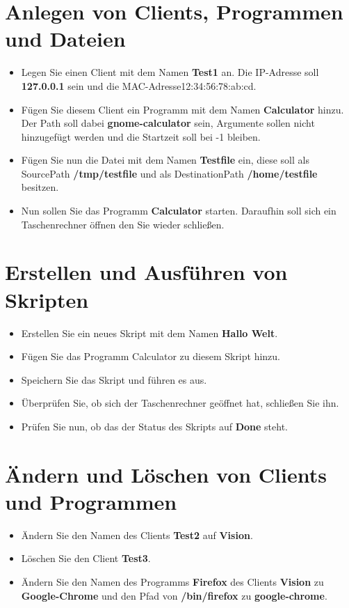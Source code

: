 \documentclass[accentcolor=tud1a,11pt]{tudexercise}
\begin{document}
\nutzerstudie
\section*{Anlegen von Clients, Programmen und Dateien}
\begin{itemize}
	\item Legen Sie einen Client mit dem Namen \textbf{Test1} an. Die IP-Adresse soll \textbf{127.0.0.1} sein und die MAC-Adresse{12:34:56:78:ab:cd}.
	\item Fügen Sie diesem Client ein Programm mit dem Namen \textbf{Calculator} hinzu. Der Path soll dabei \textbf{gnome-calculator} sein, Argumente sollen nicht hinzugefügt werden und die Startzeit soll bei -1 bleiben. 
	\item Fügen Sie nun die Datei mit dem Namen \textbf{Testfile} ein, diese soll als SourcePath \textbf{/tmp/testfile} und als DestinationPath \textbf{/home/testfile} besitzen.
	\item Nun sollen Sie das Programm \textbf{Calculator} starten. Daraufhin soll sich ein Taschenrechner öffnen den Sie wieder schließen.
\end{itemize}
\section*{Erstellen und Ausführen von Skripten}
\begin{itemize}
	\item Erstellen Sie ein neues Skript mit dem Namen \textbf{Hallo Welt}.
	\item Fügen Sie das Programm Calculator zu diesem Skript hinzu. 
	\item Speichern Sie das Skript und führen es aus.
	\item Überprüfen Sie, ob sich der Taschenrechner geöffnet hat, schließen Sie ihn.
	\item Prüfen Sie nun, ob das der Status des Skripts auf \textbf{Done} steht.
\end{itemize}
\section*{Ändern und Löschen von Clients und Programmen}
\begin{itemize}
	\item Ändern Sie den Namen des Clients \textbf{Test2} auf \textbf{Vision}.
	\item Löschen Sie den Client \textbf{Test3}.
	\item Ändern Sie den Namen des Programms \textbf{Firefox} des Clients \textbf{Vision} zu \textbf{Google-Chrome} und den Pfad von \textbf{/bin/firefox} zu \textbf{google-chrome}.
\end{itemize}
\end{document}
